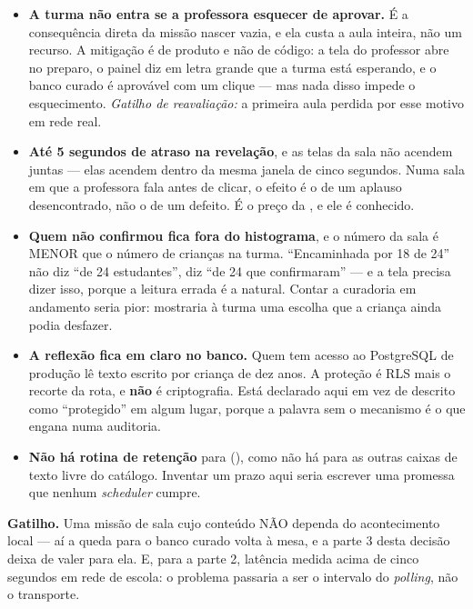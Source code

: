 \begin{itemize}
  \item \textbf{A turma não entra se a professora esquecer de aprovar.} É a
    consequência direta da missão nascer vazia, e ela custa a aula inteira, não
    um recurso. A mitigação é de produto e não de código: a tela do professor
    abre no preparo, o painel diz em letra grande que a turma está esperando, e o
    banco curado é aprovável com um clique --- mas nada disso impede o
    esquecimento. \emph{Gatilho de reavaliação:} a primeira aula perdida por
    esse motivo em rede real.
  \item \textbf{Até 5 segundos de atraso na revelação}, e as telas da sala não
    acendem juntas --- elas acendem dentro da mesma janela de cinco segundos.
    Numa sala em que a professora fala antes de clicar, o efeito é o de um
    aplauso desencontrado, não o de um defeito. É o preço da , e
    ele é conhecido.
  \item \textbf{Quem não confirmou fica fora do histograma}, e o número da sala é
    MENOR que o número de crianças na turma. \enquote{Encaminhada por 18 de 24}
    não diz \enquote{de 24 estudantes}, diz \enquote{de 24 que confirmaram} --- e
    a tela precisa dizer isso, porque a leitura errada é a natural. Contar a
    curadoria em andamento seria pior: mostraria à turma uma escolha que a
    criança ainda podia desfazer.
  \item \textbf{A reflexão fica em claro no banco.} Quem tem acesso ao
    PostgreSQL de produção lê texto escrito por criança de dez anos. A proteção é
    RLS mais o recorte da rota, e \textbf{não} é criptografia. Está declarado
    aqui em vez de descrito como \enquote{protegido} em algum lugar, porque a
    palavra sem o mecanismo é o que engana numa auditoria.
  \item \textbf{Não há rotina de retenção} para 
    (), como não há para as outras caixas de texto livre do
    catálogo. Inventar um prazo aqui seria escrever uma promessa que nenhum
    \emph{scheduler} cumpre.
\end{itemize}

\textbf{Gatilho.} Uma missão de sala cujo conteúdo NÃO dependa do acontecimento
local --- aí a queda para o banco curado volta à mesa, e a parte 3 desta decisão
deixa de valer para ela. E, para a parte 2, latência medida acima de cinco
segundos em rede de escola: o problema passaria a ser o intervalo do
\emph{polling}, não o transporte.

